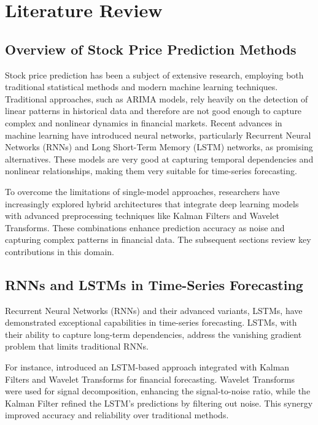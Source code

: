\chapter{Literature Review}

\section{Overview of Stock Price Prediction Methods}
Stock price prediction has been a subject of extensive research, employing both traditional statistical methods and modern machine learning techniques. Traditional approaches, such as ARIMA models, rely heavily on the detection of linear patterns in historical data and therefore are not good enough to capture complex and nonlinear dynamics in financial markets. Recent advances in machine learning have introduced neural networks, particularly Recurrent Neural Networks (RNNs) and Long Short-Term Memory (LSTM) networks, as promising alternatives. These models are very good at capturing temporal dependencies and nonlinear relationships, making them very suitable for time-series forecasting.

To overcome the limitations of single-model approaches, researchers have increasingly explored hybrid architectures that integrate deep learning models with advanced preprocessing techniques like Kalman Filters and Wavelet Transforms. These combinations enhance prediction accuracy as noise and capturing complex patterns in financial data. The subsequent sections review key contributions in this domain.

\section{RNNs and LSTMs in Time-Series Forecasting}
Recurrent Neural Networks (RNNs) and their advanced variants, LSTMs, have demonstrated exceptional capabilities in time-series forecasting. LSTMs, with their ability to capture long-term dependencies, address the vanishing gradient problem that limits traditional RNNs.  

For instance, \textcite{dastgerdi_investigating_2022} introduced an LSTM-based approach integrated with Kalman Filters and Wavelet Transforms for financial forecasting. Wavelet Transforms were used for signal decomposition, enhancing the signal-to-noise ratio, while the Kalman Filter refined the LSTM’s predictions by filtering out noise. This synergy improved accuracy and reliability over traditional methods.  

